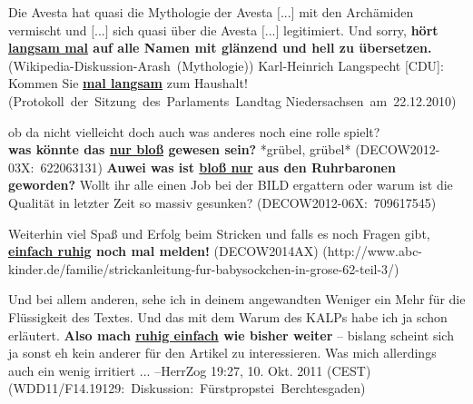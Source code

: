 \begin{exe}
	\ex\label{1196}
		\begin{xlist}	
			\ex\label{1196a}
			\scriptsize 
			{Die Avesta hat quasi die Mythologie der Avesta $[$...$]$ mit den Archämiden vermischt und $[$...$]$ sich quasi über die Avesta 			$				[$...$]$ legitimiert. Und sorry, \textbf{hört \underline{langsam mal} auf alle Namen mit \glqq glänzend und hell\grqq{} zu übersetzen.}
			\hfill\hbox {(Wikipedia-Diskussion-Arash (Mythologie))}}		
			\ex\label{1196b} 
			\scriptsize
			{Karl-Heinrich Langspecht [CDU]: Kommen Sie \underline{\textbf{mal langsam}} zum Haushalt!
			\newline
			\hbox{}\hfill\hbox {(Protokoll der Sitzung des Parlaments Landtag}
			\newline
			\hbox{}\hfill\hbox {Niedersachsen am 22.12.2010)}}
		\end{xlist}
\end{exe}

\begin{exe}
	\ex\label{1197} 
		\begin{xlist}	
			\ex\label{1197a} 
			\scriptsize 
			{ob da nicht vielleicht doch auch was anderes noch eine rolle spielt?\\
			\textbf{was könnte das \underline{nur bloß} gewesen sein?} *grübel, grübel*
			\hfill\hbox {(DECOW2012-03X: 622063131)}}		
			\ex\label{1197b} 
			\scriptsize 
			{\textbf{Auwei was ist \underline{bloß nur} aus den Ruhrbaronen geworden?} Wollt ihr alle einen Job bei der BILD ergattern oder warum ist die 				Qualität in letzter Zeit so massiv gesunken?      
			\newline
			\hbox{}\hfill\hbox {(DECOW2012-06X: 709617545)}
			\newline
			\hbox{}\hfill\hbox {\citet[14]{Mueller2014b}}}
		\end{xlist}
\end{exe}		  										         
		
\begin{exe}
	\ex\label{1198} 
		\begin{xlist}
			\ex\label{1198a} 
			\scriptsize 
			{Weiterhin viel Spaß und Erfolg beim Stricken und falls es noch Fragen gibt, \textbf{\underline{einfach ruhig} noch mal melden!}	
			\hfill\hbox {(DECOW2014AX)}			
			\newline
			\hbox{}\hfill\hbox {(http://www.abc-kinder.de/familie/strickanleitung-fur-babysockchen-in-grose-62-teil-3/)}}
			
			\ex\label{1198b} 
			\scriptsize 
			{Und bei allem anderen, sehe ich in deinem angewandten Weniger ein Mehr für die Flüssigkeit des Textes. Und das mit dem Warum des KALPs habe 				ich ja schon erläutert. \textbf{Also mach \underline{ruhig einfach} wie bisher weiter} – bislang scheint sich ja sonst eh kein anderer für den 				Artikel zu interessieren. Was mich allerdings auch ein wenig irritiert ... --HerrZog 19:27, 10. Okt. 2011 (CEST)	     
			\newline
			\hbox{}\hfill\hbox {(WDD11/F14.19129: Diskussion: Fürstpropstei Berchtesgaden)}}
		\end{xlist}
\end{exe}	

